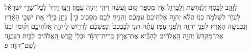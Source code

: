 \documentclass{openreader}
\begin{document}
לַזָּהָ֥ב לַכֶּ֛סֶף וְלַנְּחֹ֥שֶׁת וְלַבַּרְזֶ֖ל אֵ֣ין מִסְפָּ֑ר ק֣וּם וַעֲשֵׂ֔ה וִיהִ֥י יְהוָ֖ה עִמָּֽךְ׃ 
וַיְצַ֤ו דָּוִיד֙ לְכָל־שָׂרֵ֣י יִשְׂרָאֵ֔ל לַעְזֹ֖ר לִשְׁלֹמֹ֥ה בְנֹֽו׃ 
הֲלֹ֨א יְהוָ֤ה אֱלֹֽהֵיכֶם֙ עִמָּכֶ֔ם וְהֵנִ֥יחַ לָכֶ֖ם מִסָּבִ֑יב כִּ֣י׀ נָתַ֣ן בְּיָדִ֗י אֵ֚ת יֹשְׁבֵ֣י הָאָ֔רֶץ וְנִכְבְּשָׁ֥ה הָאָ֛רֶץ לִפְנֵ֥י יְהוָ֖ה וְלִפְנֵ֥י עַמֹּֽו׃ 
עַתָּ֗ה תְּנ֤וּ לְבַבְכֶם֙ וְנַפְשְׁכֶ֔ם לִדְרֹ֖ושׁ לַיהוָ֣ה אֱלֹהֵיכֶ֑ם וְק֗וּמוּ וּבְנוּ֙ אֶת־מִקְדַּשׁ֙ יְהוָ֣ה הָֽאֱלֹהִ֔ים לְהָבִ֞יא אֶת־אֲרֹ֣ון בְּרִית־יְהוָ֗ה וּכְלֵי֙ קֹ֣דֶשׁ הָֽאֱלֹהִ֔ים לַבַּ֖יִת הַנִּבְנֶ֥ה לְשֵׁם־יְהוָֽה׃ פ 
\end{document}
